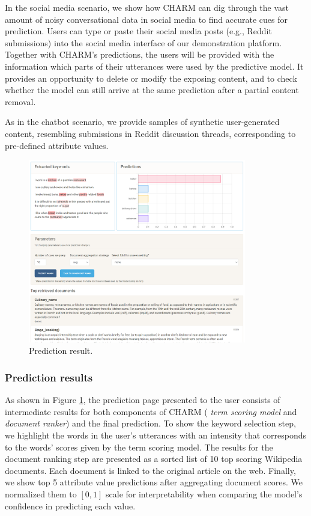 In the social media scenario, we show how CHARM 
can dig through the vast amount of 
noisy 
conversational data in social media to find accurate cues for prediction.
Users can type or paste their social media posts (e.g., Reddit submissions) into the social media interface of our demonstration platform. Together with CHARM's predictions, the users will be provided with the information which parts of their utterances were used by the predictive model. It provides an opportunity to delete or modify the exposing content, and to check whether the model can still arrive at the same prediction after a partial content removal.

As in the chatbot scenario, we provide samples of synthetic user-generated content, resembling submissions in Reddit discussion threads, corresponding to pre-defined attribute values.


\begin{figure}[th!]
    \centering
    \includegraphics[width=0.85\textwidth]{imgs/prediction-baker.png}
    \caption{Prediction result.}
    \label{pred_img}
\end{figure}

\subsubsection{Prediction results} 
As shown in Figure \ref{pred_img}, the prediction page presented to the user consists of intermediate results for both components of CHARM ( \textit{term scoring model} and \textit{document ranker}) and the final prediction. To show the keyword selection step, we highlight the words in the user's utterances with an intensity that corresponds to the words' scores given by the {term scoring model}. The results for the document ranking step are presented as a sorted list of 10 top scoring Wikipedia documents. Each document is linked to the original article on the web. Finally, we show top 5 attribute value predictions after aggregating document scores. We normalized them to $[0,1]$ scale for interpretability when comparing the model's confidence in predicting each value. 

